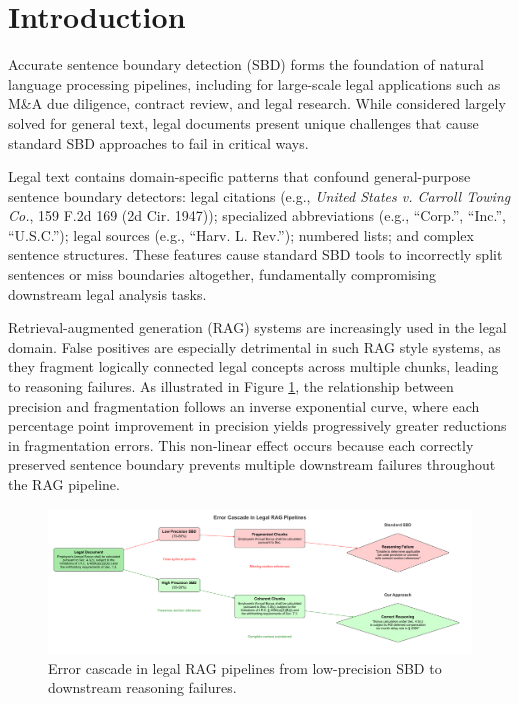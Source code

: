 \section{Introduction}
Accurate sentence boundary detection (SBD) forms the foundation of natural language processing pipelines, \cite{gillick2009sentence, read2012sentence, schweter2019deep, liu2006study, stamatatos1999automatic} including for large-scale legal applications such as M\&A due diligence, contract review, and legal research. While considered largely solved for general text, legal documents present unique challenges that cause standard SBD approaches to fail in critical ways.

Legal text contains domain-specific patterns that confound general-purpose sentence boundary detectors: legal citations (e.g., \textit{United States v. Carroll Towing Co.}, 159 F.2d 169 (2d Cir. 1947)); specialized abbreviations (e.g., ``Corp.'', ``Inc.'', ``U.S.C.''); legal sources (e.g., ``Harv. L. Rev.''); numbered lists; and complex sentence structures. These features cause standard SBD tools to incorrectly split sentences or miss boundaries altogether, fundamentally compromising downstream legal analysis tasks.  

Retrieval-augmented generation (RAG) systems are increasingly used in the legal domain. \cite{pipitone2024legalbench, wiratunga2024cbr, hindi2025enhancing, schwarcz2025ai}  False positives are especially detrimental in such RAG style systems, as they fragment logically connected legal concepts across multiple chunks, leading to reasoning failures. As illustrated in Figure \ref{fig:rag-error-cascade}, the relationship between precision and fragmentation follows an inverse exponential curve, where each percentage point improvement in precision yields progressively greater reductions in fragmentation errors. This non-linear effect occurs because each correctly preserved sentence boundary prevents multiple downstream failures throughout the RAG pipeline. 

\begin{figure}[t]
\centering
\includegraphics[width=1.05\textwidth]{figures/rag_error_cascade.pdf}
\caption{Error cascade in legal RAG pipelines from low-precision SBD to downstream reasoning failures.}
\label{fig:rag-error-cascade}
\end{figure}

